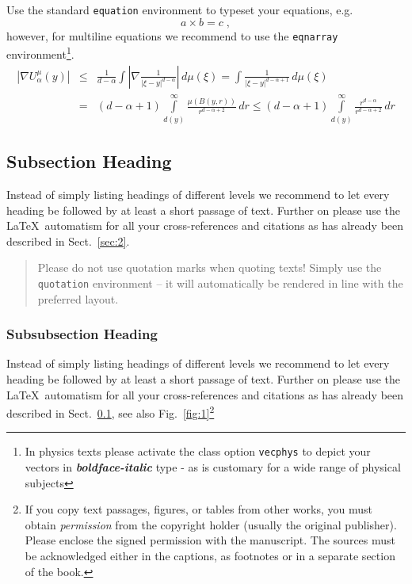 \documentclass[graybox]{svmult}
\begin{document}
Use the standard \verb|equation| environment to typeset your equations, e.g.
%
\begin{equation}
a \times b = c\;,
\end{equation}
%
however, for multiline equations we recommend to use the \verb|eqnarray| environment\footnote{In physics texts please activate the class option \texttt{vecphys} to depict your vectors in \textbf{\itshape boldface-italic} type - as is customary for a wide range of physical subjects}.
\begin{eqnarray}
\left|\nabla U_{\alpha}^{\mu}(y)\right| &\le&\frac1{d-\alpha}\int
\left|\nabla\frac1{|\xi-y|^{d-\alpha}}\right|\,d\mu(\xi) =
\int \frac1{|\xi-y|^{d-\alpha+1}} \,d\mu(\xi)  \\
&=&(d-\alpha+1) \int\limits_{d(y)}^\infty
\frac{\mu(B(y,r))}{r^{d-\alpha+2}}\,dr \le (d-\alpha+1)
\int\limits_{d(y)}^\infty \frac{r^{d-\alpha}}{r^{d-\alpha+2}}\,dr
\label{eq:01}
\end{eqnarray}

\subsection{Subsection Heading}
\label{subsec:2}
Instead of simply listing headings of different levels we recommend to let every heading be followed by at least a short passage of text.  Further on please use the \LaTeX\ automatism for all your cross-references and citations as has already been described in Sect.~\ref{sec:2}.

\begin{quotation}
Please do not use quotation marks when quoting texts! Simply use the \verb|quotation| environment -- it will automatically be rendered in line with the preferred layout.
\end{quotation}


\subsubsection{Subsubsection Heading}
Instead of simply listing headings of different levels we recommend to let every heading be followed by at least a short passage of text.  Further on please use the \LaTeX\ automatism for all your cross-references and citations as has already been described in Sect.~\ref{subsec:2}, see also Fig.~\ref{fig:1}\footnote{If you copy text passages, figures, or tables from other works, you must obtain \textit{permission} from the copyright holder (usually the original publisher). Please enclose the signed permission with the manuscript. The sources must be acknowledged either in the captions, as footnotes or in a separate section of the book.}
\end{document}

